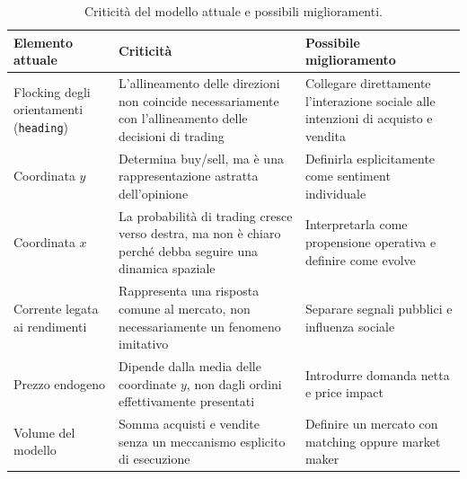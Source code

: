 \begin{table}[htbp]
    \centering
    \small
    \renewcommand{\arraystretch}{1.4}

    \begin{tabularx}{\textwidth}{
        @{}
        >{\raggedright\arraybackslash}p{}
        >{\raggedright\arraybackslash}X
        >{\raggedright\arraybackslash}X
        @{}
    }
        \toprule
        \textbf{Elemento attuale}
        & \textbf{Criticità}
        & \textbf{Possibile miglioramento} \\
        \midrule

        Flocking degli orientamenti (\texttt{heading})
        & L'allineamento delle direzioni non coincide
          necessariamente con l'allineamento delle
          decisioni di trading
        & Collegare direttamente l'interazione sociale
          alle intenzioni di acquisto e vendita \\
        \midrule

        Coordinata $y$
        & Determina buy/sell, ma è una rappresentazione
          astratta dell'opinione
        & Definirla esplicitamente come sentiment
          individuale \\
        \midrule

        Coordinata $x$
        & La probabilità di trading cresce verso destra,
          ma non è chiaro perché debba seguire una
          dinamica spaziale
        & Interpretarla come propensione operativa
          e definire come evolve \\
        \midrule

        Corrente legata ai rendimenti
        & Rappresenta una risposta comune al mercato,
          non necessariamente un fenomeno imitativo
        & Separare segnali pubblici e influenza sociale \\
        \midrule

        Prezzo endogeno
        & Dipende dalla media delle coordinate $y$,
          non dagli ordini effettivamente presentati
        & Introdurre domanda netta e price impact \\
        \midrule

        Volume del modello
        & Somma acquisti e vendite senza un meccanismo
          esplicito di esecuzione
        & Definire un mercato con matching oppure
          market maker \\

        \bottomrule
    \end{tabularx}

    \caption{Criticità del modello attuale e possibili miglioramenti.}
    \label{tab:criticita-modello}
\end{table}

